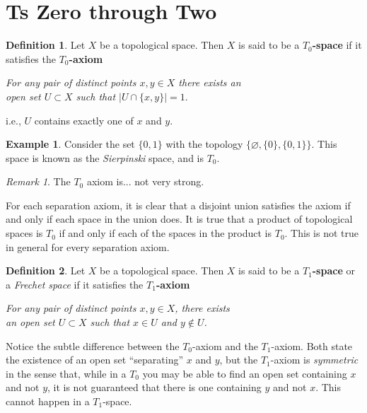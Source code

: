 \documentclass{book}
\theoremstyle{definition}
\newtheorem{definition}{Definition}[section]
\newtheorem{example}{Example}[section]
\theoremstyle{remark}
\newtheorem{remark}{Remark}[section]
\begin{document}
\section{Ts Zero through Two}

\begin{definition}
Let $X$ be a topological space. Then $X$ is said to be a \textbf{$T_0$-space} if it satisfies the \textbf{$T_0$-axiom}
\begin{center}
  \textit{For any pair of distinct points $x,y\in X$ there exists an\\ open set $U\subset X$ such that $|U\cap\{x,y\}|=1.$}
\end{center}
i.e., $U$ contains exactly one of $x$ and $y$.
\end{definition}

\begin{example}
\label{sierpinskispace}
Consider the set $\{0,1\}$ with the topology $\{\varnothing, \{0\},\{0,1\}\}$. This space is known as the \textit{Sierpinski} space, and is $T_0$.
\end{example}

\begin{remark}
The $T_0$ axiom is... not very strong.
\end{remark}

For each separation axiom, it is clear that a disjoint union satisfies the axiom if and only if each space in the union does. It is true that a product of topological spaces is $T_0$ if and only if each of the spaces in the product is $T_0$. This is not true in general for every separation axiom.

\begin{definition}
Let $X$ be a topological space. Then $X$ is said to be a \textbf{$T_1$-space} or a \textit{Frechet space} if it satisfies the \textbf{$T_1$-axiom}
\begin{center}
    \textit{For any pair of distinct points $x,y\in X$, there exists\\ an open set $U\subset X$ such that $x\in U$ and $y\notin U$.}
\end{center}
\end{definition}

Notice the subtle difference between the $T_0$-axiom and the $T_1$-axiom. Both state the existence of an open set ``separating'' $x$ and $y$, but the $T_1$-axiom is \textit{symmetric} in the sense that, while in a $T_0$ you may be able to find an open set containing $x$ and not $y$, it is not guaranteed that there is one containing $y$ and not $x$. This cannot happen in a $T_1$-space.
\end{document}
